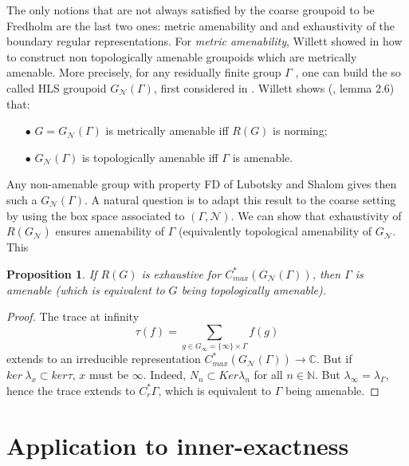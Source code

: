 \documentclass[a4paper]{amsart}
\newcommand\<{\langle}
\renewcommand\>{\rangle}
\newtheorem{proposition}[theorem]{Proposition}
\theoremstyle{definition}
\theoremstyle{remark}
\begin{document}
The only notions that are not always satisfied by the coarse groupoid to be Fredholm are the last two ones: metric amenability and and exhaustivity of the boundary regular representations. For \textit{metric amenability}, Willett showed in \cite{willett2015non} how to construct non topologically amenable groupoids which are metrically amenable. More precisely, for any residually finite group $\Gamma$ , one can build the so called HLS groupoid $G_{\mathcal N}(\Gamma)$, first considered in \cite{higson2002counterexamples}. Willett shows (\cite{willett2015non}, lemma 2.6) that:
\begin{itemize} 
\item[$\bullet$] $G= G_{\mathcal N}(\Gamma)$ is metrically amenable iff $R(G)$ is norming; 
\item[$\bullet$]$G_{\mathcal N}(\Gamma)$ is topologically amenable iff $\Gamma$ is amenable.
\end{itemize}
Any non-amenable group with property FD of Lubotsky and Shalom gives then such a $G_{\mathcal N}(\Gamma)$. A natural question is to adapt this result to the coarse setting by using the box space associated to $(\Gamma, \mathcal N)$. We can show that exhaustivity of $R(G_{\mathcal N})$ ensures amenability of $\Gamma$ (equivalently topological amenability of $G_{\mathcal N}$. This 

\begin{proposition}
If $R(G)$ is exhaustive for $C^*_{max}(G_{\mathcal N}(\Gamma))$, then $\Gamma$ is amenable (which is equivalent to $G$ being topologically amenable).
\end{proposition}

\begin{proof}
The trace at infinity 
\[\tau(f) = \sum_{g\in G_\infty = \{\infty\} \times \Gamma } f(g)\]
extends to an irreducible representation $C^*_{max}(G_{\mathcal N}(\Gamma)) \rightarrow \mathbb C$. But if $ker \ \lambda_x \subset ker \tau$, $x$ must be $\infty$. Indeed, $N_n \subset Ker \lambda_ n $ for all $n\in \mathbb N$. But $\lambda_\infty = \lambda_\Gamma$, hence the trace extends to $C_r^*\Gamma$, which is equivalent to $\Gamma$ being amenable. 
\end{proof}

\section{Application to inner-exactness}
\end{document}
